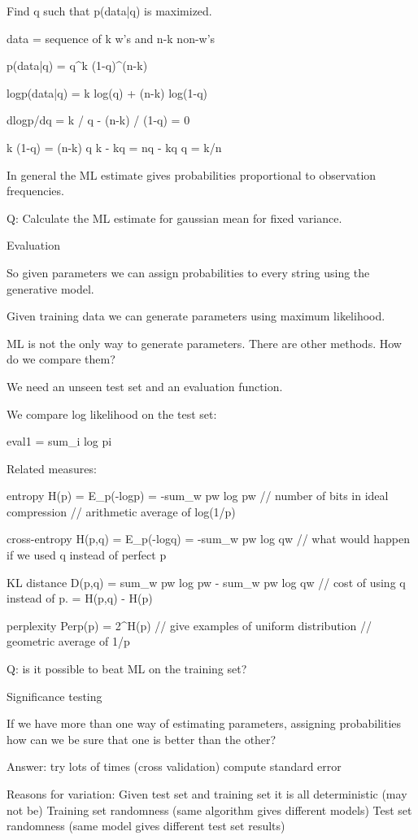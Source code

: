 \documentclass[ignorenonframetext]{beamer}
\begin{document}
Find q such that p(data|q) is maximized.

data = sequence of k w's and n-k non-w's

p(data|q) = q^k (1-q)^(n-k)

logp(data|q) = k log(q) + (n-k) log(1-q)

dlogp/dq = k / q - (n-k) / (1-q) = 0

k (1-q)  = (n-k) q
k - kq = nq - kq
q = k/n

In general the ML estimate gives probabilities proportional to
observation frequencies.

Q: Calculate the ML estimate for gaussian mean for fixed variance.



Evaluation

So given parameters we can assign probabilities to every string using
the generative model.

Given training data we can generate parameters using maximum
likelihood.

ML is not the only way to generate parameters.  There are other
methods.  How do we compare them?  

We need an unseen test set and an evaluation function.

We compare log likelihood on the test set:

eval1 = sum_i log pi

Related measures:

entropy H(p) = E_p(-logp) = -sum_w pw log pw 
// number of bits in ideal compression
// arithmetic average of log(1/p)

cross-entropy H(p,q) = E_p(-logq) = -sum_w pw log qw  
// what would happen if we used q instead of perfect p

KL distance D(p,q) = sum_w pw log pw - sum_w pw log qw  
// cost of using q instead of p. = H(p,q) - H(p)

perplexity Perp(p) = 2^H(p)
// give examples of uniform distribution
// geometric average of 1/p

Q: is it possible to beat ML on the training set?


Significance testing

If we have more than one way of estimating parameters, assigning
probabilities how can we be sure that one is better than the other?

Answer: try lots of times (cross validation)
compute standard error

Reasons for variation: 
Given test set and training set it is all deterministic (may not be)
Training set randomness (same algorithm gives different models)
Test set randomness (same model gives different test set results)
\end{document}
